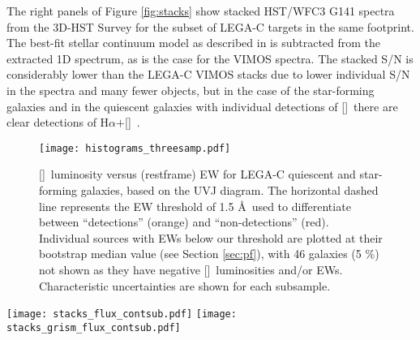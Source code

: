 \documentclass[twocolumn,natbib,iop,hyperref]{aastex62}
\newcommand{\nii}{[\ion{N}{2}]}
\newcommand{\oii}{[\ion{O}{2}]}
\newcommand{\ha}{H$\alpha$}
\begin{document}
The right panels of Figure \ref{fig:stacks} show stacked HST/WFC3 G141 spectra from the 3D-HST Survey \citep{2012ApJS..200...13B,2016ApJS..225...27M} for the subset of LEGA-C targets in the same footprint.  The best-fit stellar continuum model as described in \citet{2016ApJS..225...27M} is subtracted from the extracted 1D spectrum, as is the case for the VIMOS spectra.  The stacked S/N is considerably lower than the LEGA-C VIMOS stacks due to lower individual S/N in the spectra and many fewer objects, but in the case of the star-forming galaxies and in the quiescent galaxies with individual detections of \oii\ there are clear detections of \ha $+$\nii\ \cite[unresolved at the G141 spectral resolution; see also][]{2013ApJ...770L..39W,2016ApJ...822....1F,2020MNRAS.491.2822C}.



\begin{figure}
\begin{center}
\texttt{[image: histograms\_threesamp.pdf]} %
\caption{\oii\ luminosity versus (restframe) EW for LEGA-C quiescent and star-forming galaxies, based on the UVJ diagram.  The horizontal dashed line represents the EW threshold of 1.5 \AA\ used to differentiate between ``detections'' (orange) and ``non-detections'' (red).  Individual sources with EWs below our threshold are plotted at their bootstrap median value (see Section \ref{sec:pf}), with 46 galaxies (5 \%) not shown as they have negative \oii\ luminosities and/or EWs.  Characteristic uncertainties are shown for each subsample.}
\label{fig:hists}
\end{center}
\end{figure}

\begin{figure*}[htbp]
\begin{center}
\texttt{[image: stacks\_flux\_contsub.pdf]}%
\texttt{[image: stacks\_grism\_flux\_contsub.pdf]}
\caption{Median continuum-subtracted stacks for star-forming galaxies (bottom) and quiescent galaxies with (top) and without (middle) \oii\ emission in excess of 1.5 \AA.  The positions of prominent emission lines are denoted by dashed lines.  Balmer absorption features are denoted by the short gray dashed lines.  The left and center panels show stacks using the LEGA-C VIMOS data, and the right panels show stacks using HST/WFC3 G141 data.  Both quiescent galaxy stacks show prominent \oii\ emission, even when it is not detected in individual spectra (middle-left panel) indicating that this feature is ubiquitous in the LEGA-C sample.}


\label{fig:stacks}
\end{center}
\end{figure*}
\end{document}
